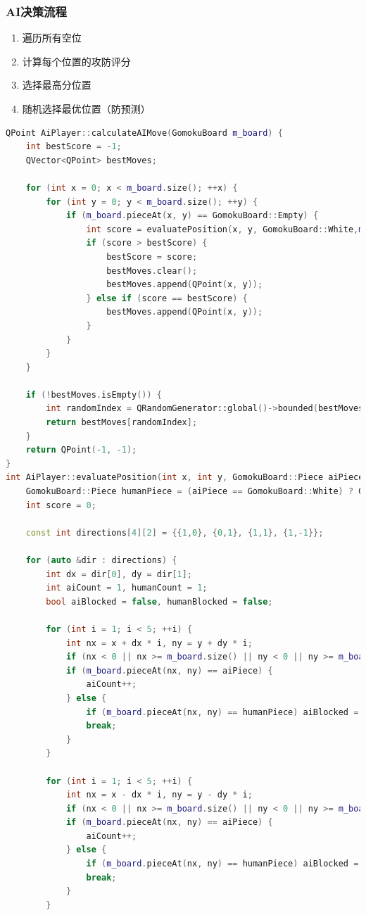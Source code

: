 \documentclass[UTF8]{ctexart}
\begin{document}
\subsubsection{AI决策流程}
\begin{enumerate}
    \item 遍历所有空位
    \item 计算每个位置的攻防评分
    \item 选择最高分位置
    \item 随机选择最优位置（防预测）
\end{enumerate}
\begin{lstlisting}[language=C++]
QPoint AiPlayer::calculateAIMove(GomokuBoard m_board) {
	int bestScore = -1;
	QVector<QPoint> bestMoves;
	
	for (int x = 0; x < m_board.size(); ++x) {
		for (int y = 0; y < m_board.size(); ++y) {
			if (m_board.pieceAt(x, y) == GomokuBoard::Empty) {
				int score = evaluatePosition(x, y, GomokuBoard::White,m_board);
				if (score > bestScore) {
					bestScore = score;
					bestMoves.clear();
					bestMoves.append(QPoint(x, y));
				} else if (score == bestScore) {
					bestMoves.append(QPoint(x, y));
				}
			}
		}
	}

	if (!bestMoves.isEmpty()) {
		int randomIndex = QRandomGenerator::global()->bounded(bestMoves.size());
		return bestMoves[randomIndex];
	}
	return QPoint(-1, -1);
}
int AiPlayer::evaluatePosition(int x, int y, GomokuBoard::Piece aiPiece,GomokuBoard m_board) {
	GomokuBoard::Piece humanPiece = (aiPiece == GomokuBoard::White) ? GomokuBoard::Black : GomokuBoard::White;
	int score = 0;
	
	const int directions[4][2] = {{1,0}, {0,1}, {1,1}, {1,-1}};
	
	for (auto &dir : directions) {
		int dx = dir[0], dy = dir[1];
		int aiCount = 1, humanCount = 1;
		bool aiBlocked = false, humanBlocked = false;

		for (int i = 1; i < 5; ++i) {
			int nx = x + dx * i, ny = y + dy * i;
			if (nx < 0 || nx >= m_board.size() || ny < 0 || ny >= m_board.size()) break;
			if (m_board.pieceAt(nx, ny) == aiPiece) {
				aiCount++;
			} else {
				if (m_board.pieceAt(nx, ny) == humanPiece) aiBlocked = true;
				break;
			}
		}

		for (int i = 1; i < 5; ++i) {
			int nx = x - dx * i, ny = y - dy * i;
			if (nx < 0 || nx >= m_board.size() || ny < 0 || ny >= m_board.size()) break;
			if (m_board.pieceAt(nx, ny) == aiPiece) {
				aiCount++;
			} else {
				if (m_board.pieceAt(nx, ny) == humanPiece) aiBlocked = true;
				break;
			}
		}
		

\end{lstlisting}
\end{document}
